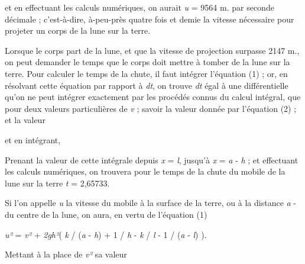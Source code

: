 \documentclass[a4paper, 11pt, oneside, polutonikogreek, french]{article}
\begin{document}

et en effectuant les calculs numériques, on aurait \emph{u} = 9564 m. par seconde décimale ; c'est-à-dire, à-peu-près quatre fois et demie la vitesse nécessaire pour projeter un corps de la lune sur la terre.

Lorsque le corps part de la lune, et que la vitesse de projection surpasse 2147 m., on peut demander le temps que le corps doit mettre à tomber de la lune sur la terre. Pour calculer le temps de la chute, il faut intégrer l'équation (1) ; or, en résolvant cette équation par rapport à \emph{dt}, on trouve \emph{dt} égal à une différentielle qu'on ne peut intégrer exactement par les procédés connus du calcul intégral, que pour deux valeurs particulières de \emph{v} ; savoir la valeur donnée par l'équation (2) ; et la valeur




et en intégrant,


Prenant la valeur de cette intégrale depuis \emph{x} = \emph{l}, jusqu'à \emph{x} = \emph{a} - \emph{h} ; et effectuant les calculs numériques, on trouvera pour le temps de la chute du mobile de la lune sur la terre \emph{t} = 2,65733.

Si l'on appelle \emph{u} la vitesse du mobile à la surface de la terre, ou à la distance \emph{a} - du centre de la lune, on aura, en vertu de l'équation (1)

\emph{u²} = \emph{v²} + \emph{2gh²}( \emph{k} / (\emph{a} - \emph{h}) + 1 / \emph{h} - \emph{k} / \emph{l} - 1 / (\emph{a} - \emph{l}) ).

Mettant à la place de \emph{v²} sa valeur
\end{document}
